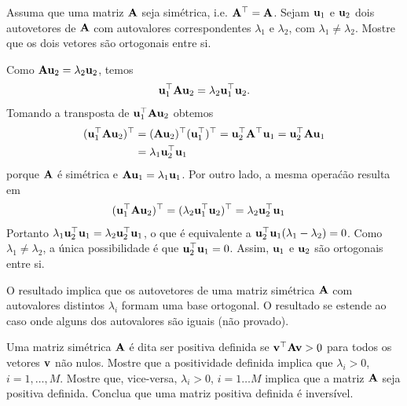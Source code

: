 \label{ex:eigenvalue-decomposition-symmetric-matrices}
\begin{exenumerate}
    \item Assuma que uma matriz $\mathbf{A}$ seja sim\'etrica, i.e. $\mathbf{A}^\top=\mathbf{A}$. Sejam $\mathbf{u}_1$ e
    $\mathbf{u}_2$ dois autovetores de $\mathbf{A}$ com autovalores correspondentes $\lambda_1$
    e $\lambda_2$, com $\lambda_1 \neq \lambda_2$. Mostre que os dois vetores
    s\~ao ortogonais entre si.
    
    \begin{solution}
        Como $\mathbf{A}\mathbf{u}_2 = \lambda_2\mathbf{u}_2$, temos
        \begin{equation}
            \mathbf{u}_1^\top \mathbf{A}\mathbf{u}_2 = \lambda_2\mathbf{u}_1^\top\mathbf{u}_2.
        \end{equation}
        Tomando a transposta de $\mathbf{u}_1^\top \mathbf{A}\mathbf{u}_2$ obtemos
        \begin{align}
            (\mathbf{u}_1^\top \mathbf{A}\mathbf{u}_2)^\top &= (\mathbf{A}\mathbf{u}_2)^\top(\mathbf{u}_1^\top)^\top = \mathbf{u}_2^\top \mathbf{A}^\top \mathbf{u}_1 = \mathbf{u}_2^\top \mathbf{A}\mathbf{u}_1 \\
            & = \lambda_1\mathbf{u}_2^\top\mathbf{u}_1
        \end{align}
        porque $\mathbf{A}$ \'e sim\'etrica e $\mathbf{A} \mathbf{u}_1 = \lambda_1 \mathbf{u}_1$. Por outro lado, a mesma opera\'c\~ao resulta em
        \begin{align}
            (\mathbf{u}_1^\top \mathbf{A}\mathbf{u}_2)^\top &= (\lambda_2\mathbf{u}_1^\top\mathbf{u}_2)^\top = \lambda_2\mathbf{u}_2^\top\mathbf{u}_1
        \end{align}
        Portanto $\lambda_1\mathbf{u}_2^\top\mathbf{u}_1 = \lambda_2\mathbf{u}_2^\top\mathbf{u}_1$, o que \'e equivalente a $\mathbf{u}_2^\top\mathbf{u}_1(\lambda_1 - \lambda_2) = 0$. Como
        $\lambda_1 \neq \lambda_2$, a \'unica possibilidade \'e que
        $\mathbf{u}_2^\top\mathbf{u}_1 = 0$. Assim, $\mathbf{u}_1$ e $\mathbf{u}_2$ s\~ao ortogonais entre si.
        
        O resultado implica que os autovetores de uma matriz sim\'etrica $\mathbf{A}$ com
        autovalores distintos $\lambda_i$ formam uma base ortogonal. O resultado
        se estende ao caso onde alguns dos autovalores s\~ao iguais (n\~ao provado).
        
        
    \end{solution}
    
    \item Uma matriz sim\'etrica $\mathbf{A}$ \'e dita ser positiva definida se $\mathbf{v}^\top\mathbf{A}\mathbf{v}>0$
    para todos os vetores $\mathbf{v}$ n\~ao nulos. Mostre que a positividade definida implica que
    $\lambda_i>0$, $i=1,\ldots, M$. Mostre que, vice-versa, $\lambda_i>0$,
    $i=1 \ldots M$ implica que a matriz $\mathbf{A}$ seja positiva definida. Conclua
    que uma matriz positiva definida \'e invers\'ivel.
    

\end{exenumerate}
